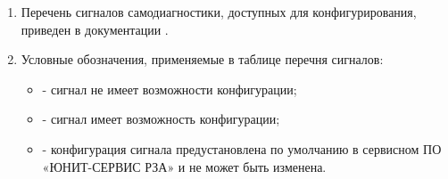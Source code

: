 \areaset{267mm}{180mm}
\fancyheadoffset{0pt} %


\begin{landscape}

\setlength{\footskip}{15.5pt}

\color{black}

\begin{enumerate}[label=\ref{app:signals}.\arabic*] %
  \item Перечень сигналов самодиагностики, доступных для конфигурирования, приведен в документации \ManualUnitGeneral.
  \item Условные обозначения, применяемые в таблице перечня сигналов:
  \begin{itemize}
    \item[$\text{(--)}$] { - сигнал не имеет возможности конфигурации;}
    \item[$\text{(+)}$] { - сигнал имеет возможность конфигурации;}
    \item[$\text{(*)}$] { - конфигурация сигнала предустановлена по умолчанию в сервисном ПО «ЮНИТ-СЕРВИС РЗА» и не может быть изменена.}
  \end{itemize}
\end{enumerate}

\small %
\begin{longtable}{
>{\centering\arraybackslash}m{6.0cm}
|>{\centering\arraybackslash}m{3.45cm}
|>{\centering\arraybackslash}m{2cm}
|>{\centering\arraybackslash}m{2cm}
|>{\centering\arraybackslash}m{2cm}
|>{\centering\arraybackslash}m{2cm}
|>{\centering\arraybackslash}m{2cm}
|>{\centering\arraybackslash}m{2cm}
|>{\centering\arraybackslash}m{2.107cm}
}


\end{longtable}
\end{landscape}
